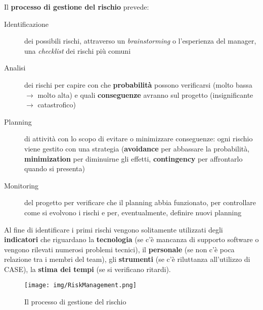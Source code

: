 Il \textbf{processo di gestione del rischio} prevede:
\begin{description}
    \item[Identificazione] dei possibili rischi, attraverso un
                \textit{brainstorming} o l'esperienza del manager,
                una \textit{checklist} dei rischi pi\`u comuni 
     
    \item[Analisi] dei rischi per capire con che \textbf{probabilit\`a}
                possono verificarsi (molto bassa $\rightarrow$ molto alta)
                e quali \textbf{conseguenze} avranno sul progetto
                (insignificante $\rightarrow$ catastrofico)

    \item[Planning] di attivit\`a con lo scopo di evitare o minimizzare
                    conseguenze: ogni rischio viene gestito con una
                    strategia (\textbf{avoidance} per abbassare la
                    probabilit\`a, \textbf{minimization} per
                    diminuirne gli effetti, \textbf{contingency}
                    per affrontarlo quando si presenta)
    
    \item[Monitoring] del progetto per verificare che il planning
                    abbia funzionato, per controllare come si
                    evolvono i rischi e per, eventualmente, definire
                    nuovi planning 
\end{description}

Al fine di identificare i primi rischi vengono solitamente utilizzati
degli \textbf{indicatori} che riguardano la \textbf{tecnologia}
(se c'\`e mancanza di supporto software o vengono rilevati numerosi
problemi tecnici), il \textbf{personale} (se non c'\`e poca relazione
tra i membri del team), gli \textbf{strumenti} (se c'\`e riluttanza
all'utilizzo di CASE), la \textbf{stima dei tempi} (se si verificano
ritardi).

\begin{figure}[H]
    \centering
    \texttt{[image: img/RiskManagement.png]}
    \caption*{Il processo di gestione del rischio}
\end{figure}